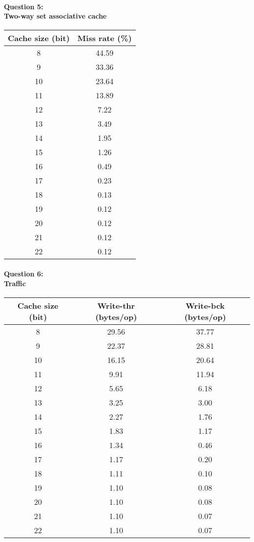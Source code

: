\documentclass[12pt,letterpaper]{article}
\begin{document}
\paragraph*{Question 5:\\Two-way set associative cache}
\begin{tabular}{|c|c|}
\hline 
Cache size (bit) & Miss rate (\%) \\ 
\hline 
8 & 44.59 \\ 
\hline 
9 & 33.36 \\ 
\hline 
10 & 23.64 \\ 
\hline 
11 & 13.89 \\ 
\hline 
12 & 7.22 \\ 
\hline 
13 & 3.49 \\ 
\hline 
14 & 1.95 \\ 
\hline 
15 & 1.26 \\ 
\hline 
16 & 0.49 \\ 
\hline 
17 & 0.23 \\ 
\hline 
18 & 0.13 \\ 
\hline 
19 & 0.12 \\ 
\hline 
20 & 0.12 \\ 
\hline 
21 & 0.12 \\ 
\hline 
22 & 0.12 \\ 
\hline 
\end{tabular} 
\paragraph*{Question 6:\\Traffic}
\begin{tabular}{|c|c|c|}
\hline 
Cache size (bit) & Write-thr (bytes/op)& Write-bck (bytes/op)\\ 
\hline 
8 & 29.56 & 37.77 \\ 
\hline 
9 & 22.37 & 28.81 \\ 
\hline 
10 & 16.15 & 20.64 \\ 
\hline 
11 & 9.91 & 11.94 \\ 
\hline 
12 & 5.65 & 6.18 \\ 
\hline 
13 & 3.25 & 3.00 \\ 
\hline 
14 & 2.27 & 1.76 \\ 
\hline 
15 & 1.83 & 1.17 \\ 
\hline 
16 & 1.34 & 0.46 \\ 
\hline 
17 & 1.17 & 0.20 \\ 
\hline 
18 & 1.11 & 0.10 \\ 
\hline 
19 & 1.10 & 0.08 \\ 
\hline 
20 & 1.10 & 0.08 \\ 
\hline 
21 & 1.10 & 0.07 \\ 
\hline 
22 & 1.10 & 0.07 \\ 
\hline 
\end{tabular} 
\end{document}

